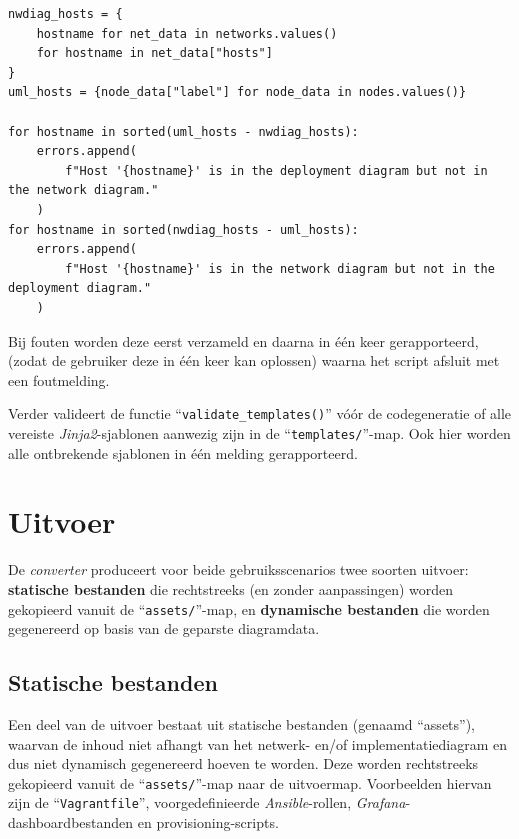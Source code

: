 \begin{codeblockfixed}
  \begin{codeblock}
    \begin{verbatim}
nwdiag_hosts = {
    hostname for net_data in networks.values()
    for hostname in net_data["hosts"]
}
uml_hosts = {node_data["label"] for node_data in nodes.values()}

for hostname in sorted(uml_hosts - nwdiag_hosts):
    errors.append(
        f"Host '{hostname}' is in the deployment diagram but not in the network diagram."
    )
for hostname in sorted(nwdiag_hosts - uml_hosts):
    errors.append(
        f"Host '{hostname}' is in the network diagram but not in the deployment diagram."
    )
\end{verbatim}
    \caption[Consistentiecontrole in ``\texttt{validate\_diagrams()}'']{Consistentiecontrole tussen het netwerk- en implementatiediagram.}
    \label{code:validate_diagrams}
  \end{codeblock}
\end{codeblockfixed}

Bij fouten worden deze eerst verzameld en daarna in één keer gerapporteerd, (zodat de gebruiker deze in één keer kan oplossen) waarna het script afsluit met een foutmelding.

Verder valideert de functie ``\texttt{validate\_templates()}'' vóór de codegeneratie of alle vereiste \emph{Jinja2}-sjablonen aanwezig zijn in de ``\texttt{templates/}''-map. Ook hier worden alle ontbrekende sjablonen in één melding gerapporteerd.

\section{Uitvoer}%
\label{sec:uitvoer}

De \emph{converter} produceert voor beide gebruiksscenarios twee soorten uitvoer: \textbf{statische bestanden} die rechtstreeks (en zonder aanpassingen) worden gekopieerd vanuit de ``\texttt{assets/}''-map, en \textbf{dynamische bestanden} die worden gegenereerd op basis van de geparste diagramdata.

\subsection{Statische bestanden}%
\label{subsec:statische_bestanden}

Een deel van de uitvoer bestaat uit statische bestanden (genaamd ``assets''), waarvan de inhoud niet afhangt van het netwerk- en/of implementatiediagram en dus niet dynamisch gegenereerd hoeven te worden. Deze worden rechtstreeks gekopieerd vanuit de ``\texttt{assets/}''-map naar de uitvoermap. Voorbeelden hiervan zijn de ``\texttt{Vagrantfile}'', voorgedefinieerde \emph{Ansible}-rollen, \emph{Grafana}-dashboardbestanden en provisioning-scripts.

